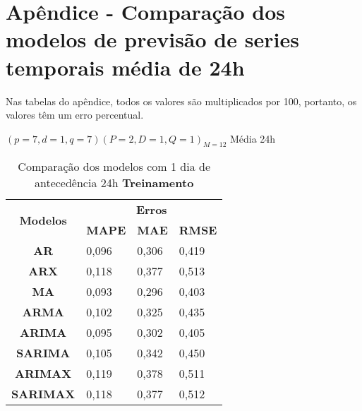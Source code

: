 
\section{Ap\^endice - Compara\c c\~ao dos modelos de previs\~ao de series temporais m\'edia de 24h}\label{sec:comtb24}

Nas tabelas do apêndice, todos os valores são multiplicados por 100, portanto, os valores têm um erro percentual.

$(p = 7,d = 1,q = 7) (P = 2,D = 1,Q = 1)_{M = 12}$ Média 24h
	\begin{table}[H]
	\centering
	\caption{Comparação dos modelos com 1 dia de antecedência 24h \textbf{Treinamento} }\label{tb:1-24trn}
	\begin{tabular}{@{}clll@{}}
		\toprule
		\multirow{2}{*}{\textbf{Modelos}} & \multicolumn{3}{c}{\textbf{Erros}}                                                                       \\ \cmidrule(l){2-4} 
		& \multicolumn{1}{c}{\textbf{MAPE}} & \multicolumn{1}{c}{\textbf{MAE}} & \multicolumn{1}{c}{\textbf{RMSE}} \\ \hline
\textbf{AR}                       & 0,096                             & 0,306                            & 0,419                             \\
\textbf{ARX}                      & 0,118                             & 0,377                            & 0,513                             \\
\textbf{MA}                       & 0,093                             & 0,296                            & 0,403                             \\
\textbf{ARMA}                     & 0,102                             & 0,325                            & 0,435                             \\
\textbf{ARIMA}                    & 0,095                             & 0,302                            & 0,405                             \\
\textbf{SARIMA}                   & 0,105                             & 0,342                            & 0,450                             \\
\textbf{ARIMAX}                   & 0,119                             & 0,378                            & 0,511                             \\
\textbf{SARIMAX}                  & 0,118                             & 0,377                            & 0,512                             \\

\end{tabular}
\end{table}
